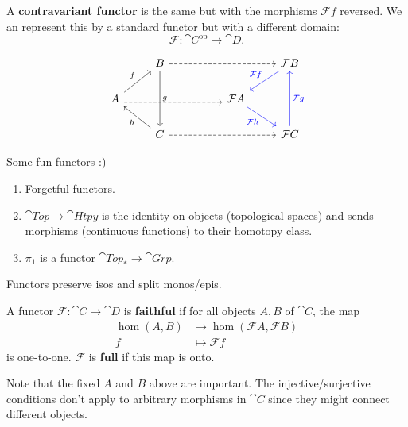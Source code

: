 \documentclass[twoside,10pt]{report}
\DeclareMathOperator{\op}{op}
\begin{document}
\begin{defn}
	A \textbf{contravariant functor} is the same but with the morphisms $\mathcal{F} f$ reversed. We an represent this by a standard functor but with a different domain:
	\[
	\mathcal{F}: \cat{C}^{\op}\to \cat{D}.
	\]
\end{defn}
\[
\begin{tikzcd}                                                   & B \arrow[dd, "g"] \arrow[rrr, dashed] &  &                                           & \mathcal{F}B \arrow[dl, blue, "\mathcal{F}f"'] \\A \arrow[ru, "f"] \arrow[rrr, dashed, shift right] &                                       &  & \mathcal{F}A \arrow[dr, blue, "\mathcal{F}h"'] &                                           \\                                                   & C \arrow[lu, "h"] \arrow[rrr, dashed] &  &                                           & \mathcal{F}C \arrow[uu, blue, "\mathcal{F}g"']
\end{tikzcd}
\]

\begin{ex}[]
Some fun functors :)
\begin{enumerate}
	\item Forgetful functors.
	\item $\cat{Top}\to \cat{Htpy}$ is the identity on objects (topological spaces) and sends morphisms (continuous functions) to their homotopy class.
	\item $\pi_1$ is a functor $\cat{Top}_{*}\to \cat{Grp}$.
\end{enumerate}
\end{ex}

\begin{prop}
Functors preserve isos and split monos/epis.
\end{prop}

\begin{defn}
A functor $\mathcal{F}:\cat{C}\to \cat{D}$ is \textbf{faithful} if for all objects $A,B$ of $\cat{C}$, the map
\begin{align*}
	\hom(A,B) &\to \hom(\mathcal{F}A, \mathcal{F}B) \\
	f &\mapsto \mathcal{F}f
\end{align*} is one-to-one. $\mathcal{F}$ is \textbf{full} if this map is onto.
\end{defn}

Note that the fixed $A$ and $B$ above are important. The injective/surjective conditions don't apply to arbitrary morphisms in $\cat{C}$ since they might connect different objects.
\end{document}
